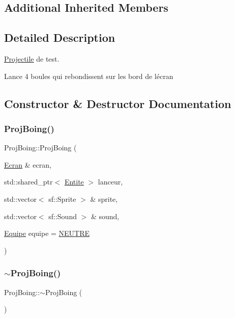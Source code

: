 \subsection*{Additional Inherited Members}


\subsection{Detailed Description}
\mbox{\hyperlink{class_projectile}{Projectile}} de test. 

Lance 4 boules qui rebondissent sur les bord de l\textquotesingle{}écran 

\subsection{Constructor \& Destructor Documentation}
\mbox{\label{class_proj_boing_a4470a575e57978e4941b5771f710d7f3}} 
\subsubsection{\texorpdfstring{Proj\+Boing()}{ProjBoing()}}
{\footnotesize\ttfamily Proj\+Boing\+::\+Proj\+Boing (\begin{DoxyParamCaption}\item[{\mbox{\hyperlink{class_ecran}{Ecran}} \&}]{ecran,  }\item[{std\+::shared\+\_\+ptr$<$ \mbox{\hyperlink{class_entite}{Entite}} $>$}]{lanceur,  }\item[{std\+::vector$<$ sf\+::\+Sprite $>$ \&}]{sprite,  }\item[{std\+::vector$<$ sf\+::\+Sound $>$ \&}]{sound,  }\item[{\mbox{\hyperlink{constantes_8h_a08fa5554288d5031a8f3bb83cc04ee83}{Equipe}}}]{equipe = {\ttfamily \mbox{\hyperlink{constantes_8h_a08fa5554288d5031a8f3bb83cc04ee83a31ad00d2974deb1103ea000de3bff57d}{N\+E\+U\+T\+RE}}} }\end{DoxyParamCaption})}

\mbox{\label{class_proj_boing_a3b5745800aa7ce95337b6e89f06d2d43}} 
\subsubsection{\texorpdfstring{$\sim$\+Proj\+Boing()}{~ProjBoing()}}
{\footnotesize\ttfamily Proj\+Boing\+::$\sim$\+Proj\+Boing (\begin{DoxyParamCaption}{ }\end{DoxyParamCaption})\hspace{0.3cm}{\ttfamily [inline]}}



